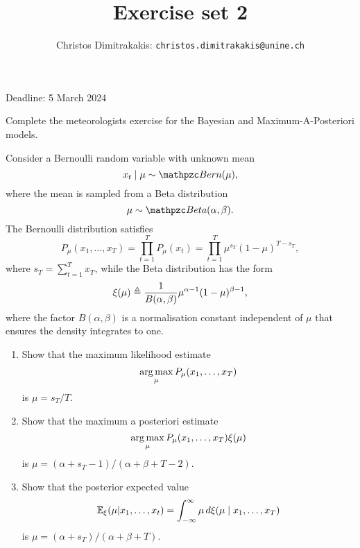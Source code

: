 \documentclass[twoside,a4paper]{article}
\begin{document}
\title{Exercise set 2}

\author{Christos Dimitrakakis: \texttt{christos.dimitrakakis@unine.ch}}

\maketitle
\large{Deadline: 5 March 2024}


\vspace{1em}


\begin{exercise}
  Complete the meteorologists exercise for the Bayesian and Maximum-A-Posteriori models.
\end{exercise}

\begin{exercise}
  Consider a  Bernoulli random variable with unknown mean
  \[
    x_t \mid \mu \sim \Bernoulli(\mu),
  \]
  where the mean is sampled from a Beta distribution
  \[
    \mu \sim \Beta(\alpha, \beta).
  \]
  The Bernoulli distribution satisfies
  \[
    P_\mu(x_1, \ldots, x_T) = \prod_{t=1}^T P_\mu(x_t) = \prod_{t=1}^T \mu^{s_T} (1 - \mu)^{T - s_T},
  \]
  where $s_T = \sum_{t=1}^T x_T$, while the Beta distribution has the form
  \[
    \xi(\mu) \mathrel{\triangleq} \frac{1}{B(\alpha, \beta)} \mu^{\alpha - 1} (1 - \mu)^{\beta - 1},
  \]
  where the factor $B(\alpha, \beta)$ is a normalisation constant independent of $\mu$ that ensures the density integrates to one.
  \begin{enumerate}
  \item Show that the maximum likelihood estimate
    \[
      \mathop{\rm arg\,max}_\mu P_\mu(x_1, \ldots, x_T) 
    \]
    is $\mu = s_T/T$.
  \item Show that the maximum a posteriori estimate
    \[
      \mathop{\rm arg\,max}_\mu P_\mu(x_1, \ldots, x_T) \xi(\mu)
    \]
    is $\mu = (\alpha + s_T - 1) / (\alpha + \beta + T - 2)$.
  \item Show that the posterior expected value
    \[
      \mathop{\mbox{\ensuremath{\mathbb{E}}}}\nolimits_\xi(\mu | x_1, \ldots, x_t) = \int_{-\infty}^\infty \mu \, d \xi(\mu \mid x_1, \ldots, x_T)
    \]
    is $\mu = (\alpha + s_T) / (\alpha + \beta + T)$.
  \end{enumerate}
  
\end{exercise}
\if{}
\end{document}

